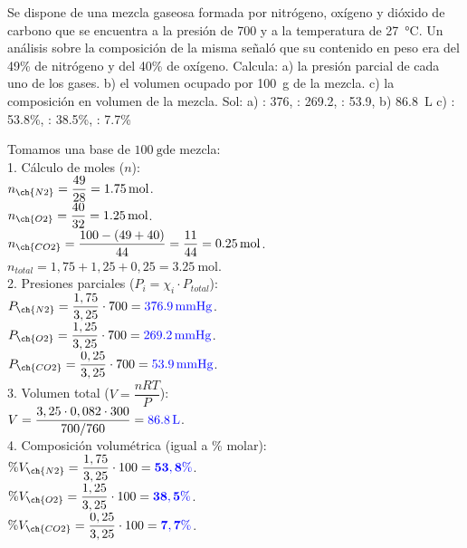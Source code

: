 \begin{exercise}
    Se dispone de una mezcla gaseosa formada por nitrógeno, oxígeno y dióxido de carbono que se encuentra a la presión de  \qty{700}{\mmhg} y a la temperatura de \qty{27}{\celsius}.
    Un análisis sobre la composición de la misma señaló que su contenido en peso era del 49\% de nitrógeno y del 40\% de oxígeno. Calcula: a) la presión parcial de cada uno de los gases. b) el volumen ocupado por \qty{100}{\g}  de la mezcla. c) la composición en volumen de la mezcla.
    Sol: a) : \qty{376}{\mmhg}, : \qty{269.2}{\mmhg}, :  \qty{53.9}{\mmhg}, b) \qty{86.8}{\L}
    c) : \num{53,8}\%, : \num{38,5}\%, : \num{7,7}\%

    \begin{solu}
        Tomamos una base de \( \qty{100}{\g} \)de mezcla: \\
        1. Cálculo de moles (\( n \)): \\
        \( n_{\ch{N2}} = \dfrac{49}{28} = \qty{1,75}{\mol} \). \\
        \( n_{\ch{O2}} = \dfrac{40}{32} = \qty{1,25}{\mol} \). \\
        \( n_{\ch{CO2}} = \dfrac{100 - (49+40)}{44} = \dfrac{11}{44} = \qty{0,25}{\mol} \). \\
        \( n_{total} = 1,75 + 1,25 + 0,25 = \qty{3,25}{\mol} \). \\
        2. Presiones parciales (\( P_i = \chi_i \cdot P_{total} \)): \\
        \( P_{\ch{N2}} = \dfrac{1,75}{3,25} \cdot 700 = \mathbf{\textcolor{blue}{\qty{376,9}{\mmHg}}} \). \\
        \( P_{\ch{O2}} = \dfrac{1,25}{3,25} \cdot 700 = \mathbf{\textcolor{blue}{\qty{269,2}{\mmHg}}} \). \\
        \( P_{\ch{CO2}} = \dfrac{0,25}{3,25} \cdot 700 = \mathbf{\textcolor{blue}{\qty{53,9}{\mmHg}}} \). \\
        3. Volumen total (\( V = \dfrac{nRT}{P} \)): \\
        \( V = \dfrac{3,25 \cdot 0,082 \cdot 300}{700/760} = \mathbf{\textcolor{blue}{\qty{86,8}{\L}}} \). \\
        4. Composición volumétrica (igual a \% molar): \\
        \( \%V_{\ch{N2}} = \dfrac{1,75}{3,25} \cdot 100 = \mathbf{\textcolor{blue}{53,8 \%}} \). \\
        \( \%V_{\ch{O2}} = \dfrac{1,25}{3,25} \cdot 100 = \mathbf{\textcolor{blue}{38,5 \%}} \). \\
        \( \%V_{\ch{CO2}} = \dfrac{0,25}{3,25} \cdot 100 = \mathbf{\textcolor{blue}{7,7 \%}} \).
    \end{solu}
\end{exercise}

